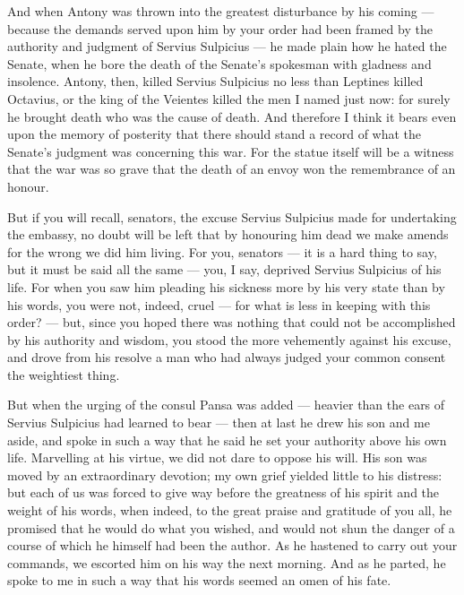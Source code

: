  And when Antony was thrown into the greatest disturbance by his coming --- because the demands served upon him by your order had been framed by the authority and judgment of Servius Sulpicius --- he made plain how he hated the Senate, when he bore the death of the Senate's spokesman with gladness and insolence. Antony, then, killed Servius Sulpicius no less than Leptines killed Octavius, or the king of the Veientes killed the men I named just now: for surely he brought death who was the cause of death. And therefore I think it bears even upon the memory of posterity that there should stand a record of what the Senate's judgment was concerning this war. For the statue itself will be a witness that the war was so grave that the death of an envoy won the remembrance of an honour.

 But if you will recall, senators, the excuse Servius Sulpicius made for undertaking the embassy, no doubt will be left that by honouring him dead we make amends for the wrong we did him living. For you, senators --- it is a hard thing to say, but it must be said all the same --- you, I say, deprived Servius Sulpicius of his life. For when you saw him pleading his sickness more by his very state than by his words, you were not, indeed, cruel --- for what is less in keeping with this order? --- but, since you hoped there was nothing that could not be accomplished by his authority and wisdom, you stood the more vehemently against his excuse, and drove from his resolve a man who had always judged your common consent the weightiest thing.

 But when the urging of the consul Pansa was added --- heavier than the ears of Servius Sulpicius had learned to bear --- then at last he drew his son and me aside, and spoke in such a way that he said he set your authority above his own life. Marvelling at his virtue, we did not dare to oppose his will. His son was moved by an extraordinary devotion; my own grief yielded little to his distress: but each of us was forced to give way before the greatness of his spirit and the weight of his words, when indeed, to the great praise and gratitude of you all, he promised that he would do what you wished, and would not shun the danger of a course of which he himself had been the author. As he hastened to carry out your commands, we escorted him on his way the next morning. And as he parted, he spoke to me in such a way that his words seemed an omen of his fate.

